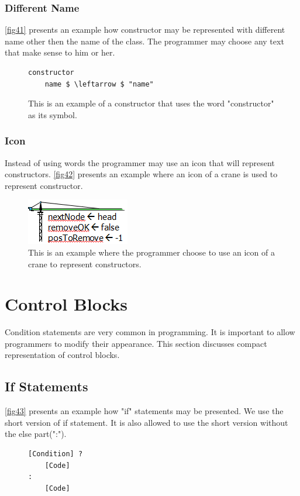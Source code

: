 \subsubsection{Different Name}
\autoref{fig41} presents an example how constructor may be represented with different name other then the name of the class. The programmer may choose any text that make sense to him or her.
\begin{figure}[H]
\begin{lstlisting}
constructor
	name $ \leftarrow $ "name"
\end{lstlisting}
\caption{This is an example of a constructor that uses the word "constructor" as its symbol.}
\label{fig41}
\end{figure}
\subsubsection{Icon}
Instead of using words the programmer may use an icon that will represent constructors. \autoref{fig42} presents an example where an icon of a crane is used to represent constructor.
\begin{figure}[H]
\includegraphics{"./fig/Crane Constructor"}
\caption{This is an example where the programmer choose to use an icon of a crane to represent constructors.}
\label{fig42}
\end{figure}
\section{Control Blocks}
Condition statements are very common in programming. It is important to allow programmers to modify their appearance. This section discusses compact representation of control blocks.
\subsection{If Statements}
\autoref{fig43} presents an example how "if" statements may be presented. We use the short version of if statement. It is also allowed to use the short version without the else part(":").
\begin{figure}[H]
\begin{lstlisting}
[Condition] ?
	[Code]
:
	[Code]
\end{lstlisting}
\caption{}
\label{fig43}
\end{figure}
